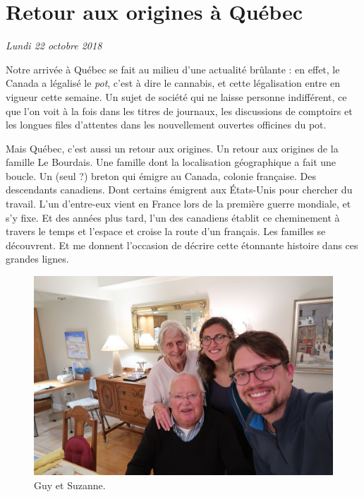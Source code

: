 \hypertarget{retour-aux-origines-uxe0-quuxe9bec}{%
\section{Retour aux origines à
Québec}\label{retour-aux-origines-uxe0-quuxe9bec}}

\emph{Lundi 22 octobre 2018}

Notre arrivée à Québec se fait au milieu d'une actualité brûlante : en
effet, le Canada a légalisé le \emph{pot}, c'est à dire le cannabis, et
cette légalisation entre en vigueur cette semaine. Un sujet de société
qui ne laisse personne indifférent, ce que l'on voit à la fois dans les
titres de journaux, les discussions de comptoirs et les longues files
d'attentes dans les nouvellement ouvertes officines du pot.

Mais Québec, c'est aussi un retour aux origines. Un retour aux origines
de la famille Le Bourdais. Une famille dont la localisation géographique
a fait une boucle. Un (seul ?) breton qui émigre au Canada, colonie
française. Des descendants canadiens. Dont certains émigrent aux
États-Unis pour chercher du travail. L'un d'entre-eux vient en France
lors de la première guerre mondiale, et s'y fixe. Et des années plus
tard, l'un des canadiens établit ce cheminement à travers le temps et
l'espace et croise la route d'un français. Les familles se découvrent.
Et me donnent l'occasion de décrire cette étonnante histoire dans ces
grandes lignes.

\begin{figure}
\centering
\includegraphics{images/20181022_GuySue.JPG}
\caption{Guy et Suzanne.}
\end{figure}

